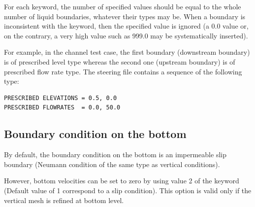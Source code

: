 For each keyword, the number of specified values should be equal to the whole
number of liquid boundaries, whatever their types may be. When a boundary is
inconsistent with the keyword, then the specified value is ignored (a 0.0 value
or, on the contrary, a very high value such as 999.0 may be systematically
inserted).

For example, in the channel test case, the first boundary (downstream boundary)
is of prescribed level type whereas the second one (upstream boundary) is of
prescribed flow rate type. The steering file contains a sequence of the
following type:

\begin{lstlisting}[language=TelemacCas]
PRESCRIBED ELEVATIONS = 0.5, 0.0
PRESCRIBED FLOWRATES  = 0.0, 50.0
\end{lstlisting}

\subsection{Boundary condition on the bottom}

By default, the boundary condition on the bottom is an impermeable slip
boundary (Neumann condition of the same type as vertical conditions).

However, bottom velocities can be set to zero by using value 2 of the keyword
 (Default value of 1 correspond to a
slip condition). This option is valid only if the vertical mesh is refined at
bottom level.

